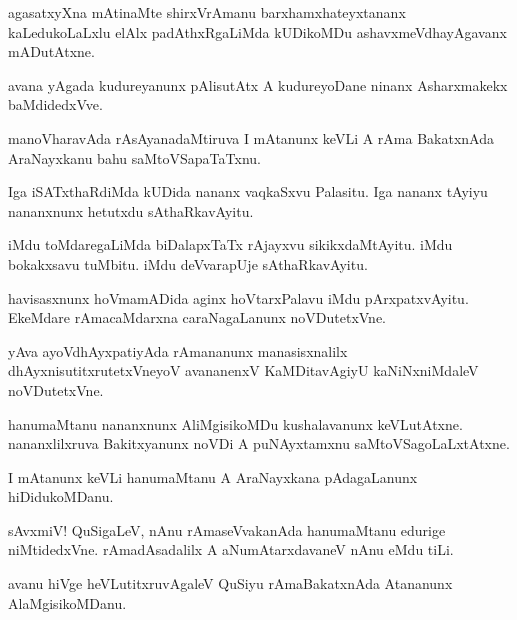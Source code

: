 \documentclass{article}
\begin{document}
\begin{mn}%
agasatxyXna mAtinaMte shirxVrAmanu barxhamxhateyxtananx kaLedukoLaLxlu elAlx padAthxRgaLiMda 
kUDikoMDu ashavxmeVdhayAgavanx mADutAtxne.
\end{mn}

\begin{mn}%
avana yAgada kudureyanunx pAlisutAtx A kudureyoDane ninanx Asharxmakekx baMdidedxVve.
\end{mn}

\begin{mn}%
manoVharavAda rAsAyanadaMtiruva I mAtanunx keVLi A rAma BakatxnAda AraNayxkanu bahu 
saMtoVSapaTaTxnu.
\end{mn}

\begin{mn}%
Iga iSATxthaRdiMda kUDida nananx vaqkaSxvu Palasitu. Iga nananx tAyiyu nananxnunx hetutxdu 
sAthaRkavAyitu.
\end{mn}

\begin{mn}%
iMdu toMdaregaLiMda biDalapxTaTx rAjayxvu sikikxdaMtAyitu. iMdu bokakxsavu tuMbitu. iMdu 
deVvarapUje sAthaRkavAyitu.
\end{mn}

\begin{mn}%
havisasxnunx hoVmamADida aginx hoVtarxPalavu iMdu pArxpatxvAyitu. EkeMdare rAmacaMdarxna 
caraNagaLanunx noVDutetxVne.
\end{mn}

\begin{mn}%
yAva ayoVdhAyxpatiyAda rAmananunx manasisxnalilx dhAyxnisutitxrutetxVneyoV avananenxV 
KaMDitavAgiyU kaNiNxniMdaleV noVDutetxVne.
\end{mn}

\begin{mn}%
hanumaMtanu nananxnunx AliMgisikoMDu kushalavanunx keVLutAtxne. nananxlilxruva 
Bakitxyanunx noVDi A puNAyxtamxnu saMtoVSagoLaLxtAtxne.
\end{mn}

\begin{mn}%
I mAtanunx keVLi hanumaMtanu A AraNayxkana pAdagaLanunx hiDidukoMDanu.
\end{mn}

\begin{mn}%
sAvxmiV! QuSigaLeV, nAnu rAmaseVvakanAda hanumaMtanu edurige niMtidedxVne. rAmadAsadalilx 
A aNumAtarxdavaneV nAnu eMdu tiLi.
\end{mn}

\begin{mn}%
avanu hiVge heVLutitxruvAgaleV QuSiyu rAmaBakatxnAda Atananunx AlaMgisikoMDanu.
\end{mn}
\end{document}
